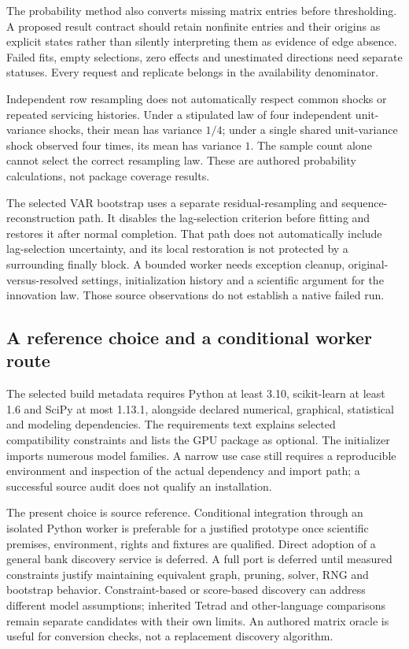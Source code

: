 The probability method also converts missing matrix entries before
thresholding. A proposed result contract should retain nonfinite entries
and their origins as explicit states rather than silently interpreting
them as evidence of edge absence. Failed fits, empty selections, zero
effects and unestimated directions need separate statuses. Every request
and replicate belongs in the availability denominator.
\citep{exec24_lingam_source,exec24_lingam_choice}

Independent row resampling does not automatically respect common shocks
or repeated servicing histories. Under a stipulated law of four independent
unit-variance shocks, their mean has variance $1/4$; under a single shared
unit-variance shock observed four times, its mean has variance $1$.
The sample count alone cannot select the correct resampling law.
These are authored probability calculations, not package coverage results.
\citep{exec24_lingam_choice}

The selected VAR bootstrap uses a separate residual-resampling and
sequence-reconstruction path. It disables the lag-selection criterion
before fitting and restores it after normal completion. That path does
not automatically include lag-selection uncertainty, and its local
restoration is not protected by a surrounding finally block. A bounded
worker needs exception cleanup, original-versus-resolved settings,
initialization history and a scientific argument for the innovation law.
Those source observations do not establish a native failed run.
\citep{exec24_lingam_source}

\subsection{A reference choice and a conditional worker route}
The selected build metadata requires Python at least 3.10, scikit-learn
at least 1.6 and SciPy at most 1.13.1, alongside declared numerical,
graphical, statistical and modeling dependencies. The requirements text
explains selected compatibility constraints and lists the GPU package as
optional. The initializer imports numerous model families. A narrow use
case still requires a reproducible environment and inspection of the
actual dependency and import path; a successful source audit does not
qualify an installation.~\citep{exec24_lingam_source}

The present choice is source reference. Conditional integration through
an isolated Python worker is preferable for a justified prototype once
scientific premises, environment, rights and fixtures are qualified.
Direct adoption of a general bank discovery service is deferred. A full
port is deferred until measured constraints justify maintaining equivalent
graph, pruning, solver, RNG and bootstrap behavior. Constraint-based or
score-based discovery can address different model assumptions; inherited
Tetrad and other-language comparisons remain separate candidates with
their own limits. An authored matrix oracle is useful for conversion
checks, not a replacement discovery algorithm.
\citep{exec24_lingam_choice}

